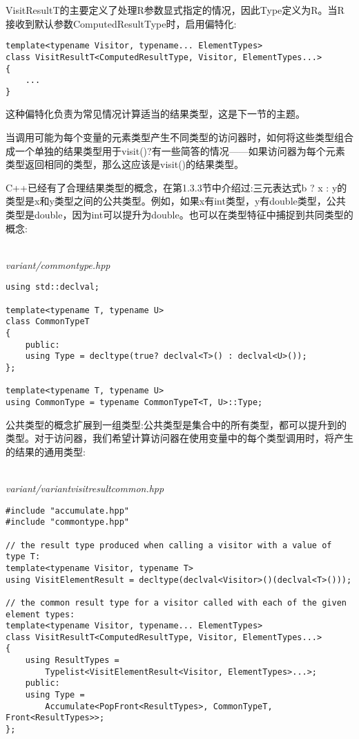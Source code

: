 VisitResultT的主要定义了处理R参数显式指定的情况，因此Type定义为R。当R接收到默认参数ComputedResultType时，启用偏特化:

\begin{lstlisting}[style=styleCXX]
template<typename Visitor, typename... ElementTypes>
class VisitResultT<ComputedResultType, Visitor, ElementTypes...>
{
	...
}
\end{lstlisting}

这种偏特化负责为常见情况计算适当的结果类型，这是下一节的主题。


当调用可能为每个变量的元素类型产生不同类型的访问器时，如何将这些类型组合成一个单独的结果类型用于visit()?有一些简答的情况——如果访问器为每个元素类型返回相同的类型，那么这应该是visit()的结果类型。

C++已经有了合理结果类型的概念，在第1.3.3节中介绍过:三元表达式b ? x : y的类型是x和y类型之间的公共类型。例如，如果x有int类型，y有double类型，公共类型是double，因为int可以提升为double。也可以在类型特征中捕捉到共同类型的概念:

\hspace*{\fill} \\ %
\noindent
\textit{variant/commontype.hpp}
\begin{lstlisting}[style=styleCXX]
using std::declval;

template<typename T, typename U>
class CommonTypeT
{
	public:
	using Type = decltype(true? declval<T>() : declval<U>());
};

template<typename T, typename U>
using CommonType = typename CommonTypeT<T, U>::Type;
\end{lstlisting}

公共类型的概念扩展到一组类型:公共类型是集合中的所有类型，都可以提升到的类型。对于访问器，我们希望计算访问器在使用变量中的每个类型调用时，将产生的结果的通用类型:

\hspace*{\fill} \\ %
\noindent
\textit{variant/variantvisitresultcommon.hpp}
\begin{lstlisting}[style=styleCXX]
#include "accumulate.hpp"
#include "commontype.hpp"

// the result type produced when calling a visitor with a value of type T:
template<typename Visitor, typename T>
using VisitElementResult = decltype(declval<Visitor>()(declval<T>()));

// the common result type for a visitor called with each of the given element types:
template<typename Visitor, typename... ElementTypes>
class VisitResultT<ComputedResultType, Visitor, ElementTypes...>
{
	using ResultTypes =
		Typelist<VisitElementResult<Visitor, ElementTypes>...>;
	public:
	using Type =
		Accumulate<PopFront<ResultTypes>, CommonTypeT, Front<ResultTypes>>;
};
\end{lstlisting}

